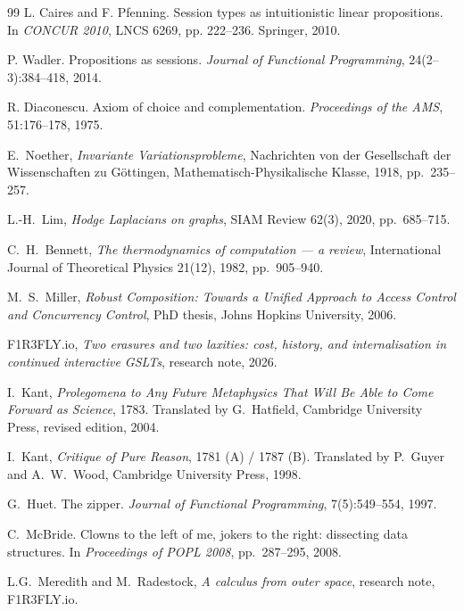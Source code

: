 \begin{thebibliography}{99}
L. Caires and F. Pfenning. Session types as intuitionistic linear propositions.
In \emph{CONCUR 2010}, LNCS 6269, pp. 222--236. Springer, 2010.

P. Wadler. Propositions as sessions. \emph{Journal of Functional Programming},
24(2--3):384--418, 2014.

R. Diaconescu. Axiom of choice and complementation.
\emph{Proceedings of the AMS}, 51:176--178, 1975.


E.~Noether, \emph{Invariante Variationsprobleme}, Nachrichten von der Gesellschaft der Wissenschaften zu G\"ottingen, Mathematisch-Physikalische Klasse, 1918, pp.~235--257.

L.-H.~Lim, \emph{Hodge Laplacians on graphs}, SIAM Review 62(3), 2020, pp.~685--715.

C.~H.~Bennett, \emph{The thermodynamics of computation --- a review}, International Journal of Theoretical Physics 21(12), 1982, pp.~905--940.

M.~S.~Miller, \emph{Robust Composition: Towards a Unified Approach to Access Control and Concurrency Control}, PhD thesis, Johns Hopkins University, 2006.

F1R3FLY.io, \emph{Two erasures and two laxities: cost, history, and internalisation in continued interactive GSLTs}, research note, 2026.


I.~Kant, \emph{Prolegomena to Any Future Metaphysics That Will Be Able to Come Forward as Science}, 1783. Translated by G.~Hatfield, Cambridge University Press, revised edition, 2004.

I.~Kant, \emph{Critique of Pure Reason}, 1781 (A) / 1787 (B). Translated by P.~Guyer and A.~W.~Wood, Cambridge University Press, 1998.

G.~Huet. The zipper. \emph{Journal of Functional Programming}, 7(5):549--554, 1997.

C.~McBride. Clowns to the left of me, jokers to the right: dissecting data structures. In \emph{Proceedings of POPL 2008}, pp.~287--295, 2008.

L.G.~Meredith and M.~Radestock, \emph{A calculus from outer space}, research note, F1R3FLY.io.





\end{thebibliography}
